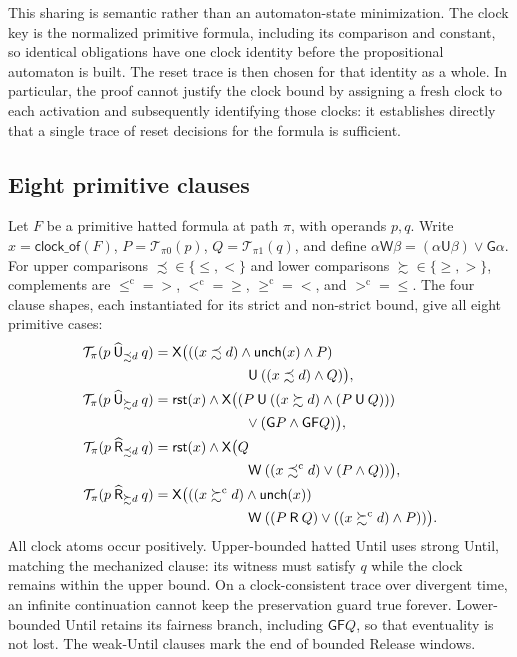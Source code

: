 \documentclass[10pt,journal,compsoc]{IEEEtran}
\newcommand{\Until}{\mathbin{\mathsf{U}}}
\newcommand{\Release}{\mathbin{\mathsf{R}}}
\newcommand{\hUntil}{\mathbin{\widehat{\mathsf{U}}}}
\newcommand{\hRelease}{\mathbin{\widehat{\mathsf{R}}}}
\newcommand{\Next}{\mathsf{X}}
\newcommand{\Always}{\mathsf{G}}
\newcommand{\Eventually}{\mathsf{F}}
\newcommand{\WeakUntil}{\mathbin{\mathsf{W}}}
\newcommand{\Reset}{\mathsf{rst}}
\newcommand{\Unch}{\mathsf{unch}}
\newcommand{\T}{\mathcal{T}}
\begin{document}
This sharing is semantic rather than an automaton-state minimization. The
clock key is the normalized primitive formula, including its comparison and
constant, so identical obligations have one clock identity before the
propositional automaton is built. The reset trace is then chosen for that
identity as a whole. In particular, the proof cannot justify the clock bound
by assigning a fresh clock to each activation and subsequently identifying
those clocks: it establishes directly that a single trace of reset decisions
for the formula is sufficient.

\subsection{Eight primitive clauses}
\label{sec:mtlbuchi}
Let $F$ be a primitive hatted formula at path $\pi$, with operands $p,q$.
Write $x=\mathsf{clock\_of}(F)$, $P=\T_{\pi0}(p)$,
$Q=\T_{\pi1}(q)$, and define
$\alpha\WeakUntil\beta=(\alpha\Until\beta)\lor\Always\alpha$.
For upper comparisons $\precsim\in\{\le,<\}$ and lower comparisons
$\succsim\in\{\ge,>\}$, complements are
$\le^{\mathrm c}=>$, $<^{\mathrm c}=\ge$, $\ge^{\mathrm c}=<$, and
$>^{\mathrm c}=\le$. The four clause shapes, each instantiated for its
strict and non-strict bound, give all eight primitive cases:
\begin{align}
\T_\pi(p\hUntil_{\precsim d}q)
 &=\Next\bigl(((x\precsim d)\land\Unch(x)\land P)\nonumber\\
 &\hspace{23mm}\Until((x\precsim d)\land Q)\bigr),\label{eq:t-hule}\\
\T_\pi(p\hUntil_{\succsim d}q)
 &=\Reset(x)\land\Next\bigl((P\Until((x\succsim d)\land(P\Until Q)))\nonumber\\
 &\hspace{23mm}\lor(\Always P\land\Always\Eventually Q)\bigr),\label{eq:t-huge}\\
\T_\pi(p\hRelease_{\precsim d}q)
 &=\Reset(x)\land\Next\bigl(Q\nonumber\\
 &\hspace{23mm}\WeakUntil((x\mathrel{\precsim^{\mathrm c}}d)\lor(P\land Q))\bigr),\label{eq:t-hrle}\\
\T_\pi(p\hRelease_{\succsim d}q)
 &=\Next\bigl(((x\mathrel{\succsim^{\mathrm c}}d)\land\Unch(x))\nonumber\\
 &\hspace{23mm}\WeakUntil((P\Release Q)\lor((x\mathrel{\succsim^{\mathrm c}}d)\land P))\bigr).
 \label{eq:t-hrge}
\end{align}
All clock atoms occur positively. Upper-bounded hatted Until uses strong
Until, matching the mechanized clause: its witness must satisfy $q$ while the
clock remains within the upper bound. On a clock-consistent trace over
divergent time, an infinite continuation cannot keep the preservation guard
true forever. Lower-bounded Until retains its
fairness branch, including $\Always\Eventually Q$, so that eventuality is
not lost. The weak-Until clauses mark the end of bounded Release windows.
\end{document}
